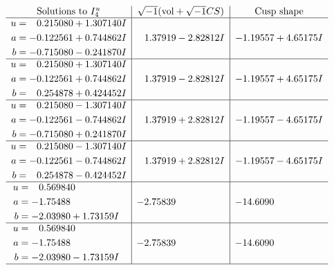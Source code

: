 \documentclass[1p]{elsarticle_modified}
\theoremstyle{definition}
\newcommand{\I}{\sqrt{-1}}
\begin{document}
$$\begin{array}{c|c|c}  
\text{Solutions to }I^u_{4}& \I (\text{vol} + \sqrt{-1}CS) & \text{Cusp shape}\\
 \hline 
\begin{aligned}
u &= \phantom{-}0.215080 + 1.307140 I \\
a &= -0.122561 + 0.744862 I \\
b &= -0.715080 - 0.241870 I\end{aligned}
 & \phantom{-}1.37919 - 2.82812 I & -1.19557 + 4.65175 I \\ \hline\begin{aligned}
u &= \phantom{-}0.215080 + 1.307140 I \\
a &= -0.122561 + 0.744862 I \\
b &= \phantom{-}0.254878 + 0.424452 I\end{aligned}
 & \phantom{-}1.37919 - 2.82812 I & -1.19557 + 4.65175 I \\ \hline\begin{aligned}
u &= \phantom{-}0.215080 - 1.307140 I \\
a &= -0.122561 - 0.744862 I \\
b &= -0.715080 + 0.241870 I\end{aligned}
 & \phantom{-}1.37919 + 2.82812 I & -1.19557 - 4.65175 I \\ \hline\begin{aligned}
u &= \phantom{-}0.215080 - 1.307140 I \\
a &= -0.122561 - 0.744862 I \\
b &= \phantom{-}0.254878 - 0.424452 I\end{aligned}
 & \phantom{-}1.37919 + 2.82812 I & -1.19557 - 4.65175 I \\ \hline\begin{aligned}
u &= \phantom{-}0.569840\phantom{ +0.000000I} \\
a &= -1.75488\phantom{ +0.000000I} \\
b &= -2.03980 + 1.73159 I\end{aligned}
 & -2.75839\phantom{ +0.000000I} & -14.6090\phantom{ +0.000000I} \\ \hline\begin{aligned}
u &= \phantom{-}0.569840\phantom{ +0.000000I} \\
a &= -1.75488\phantom{ +0.000000I} \\
b &= -2.03980 - 1.73159 I\end{aligned}
 & -2.75839\phantom{ +0.000000I} & -14.6090\phantom{ +0.000000I}\\
 \hline 
 \end{array}$$\newpage\newpage\renewcommand{\arraystretch}{1}
\end{document}
